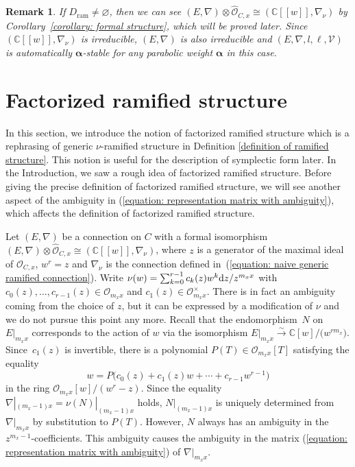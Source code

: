 \documentclass[pdftex]{sigma}
\numberwithin{equation}{section}
\newtheorem{Remark}[Theorem]{Remark}
\newcommand{\balpha}{\boldsymbol \alpha}
\begin{document}
\begin{Remark}If $D_{\mathrm{ram}}\neq\varnothing$,
then we can see
$(E,\nabla)\otimes\widehat{\mathcal O}_{C,x}\cong(\mathbb{C}[[w]],\nabla_{\nu})$
by Corollary~\ref{corollary: formal structure},
which will be proved later.
Since $(\mathbb{C}[[w]],\nabla_{\nu})$ is irreducible,
$(E,\nabla)$ is also irreducible and
$(E,\nabla,l,\ell,{\mathcal V})$ is automatically $\balpha$-stable for
any parabolic weight $\balpha$ in this case.
\end{Remark}



\section {Factorized ramified structure}
\label{section: factorized ramified structure}


In this section, we introduce the notion of factorized ramified structure
which is a rephrasing of generic $\nu$-ramified structure
in Definition \ref{definition of ramified structure}.
This notion is useful for the description of symplectic form later.
In the Introduction, we saw a rough idea of factorized ramified structure.
Before giving the precise definition of factorized ramified structure,
we will see another aspect of the ambiguity
in (\ref{equation: representation matrix with ambiguity}),
which affects the definition of factorized ramified structure.

Let $(E,\nabla)$ be a connection on $C$ with a formal isomorphism
$(E,\nabla)\otimes\widehat{\mathcal O}_{C,x}
\cong (\mathbb{C}[[w]], \nabla_{\nu})$,
where $z$ is a generator of the maximal ideal of ${\mathcal O}_{C,x}$, $w^r=z$
and $\nabla_{\nu}$ is the connection defined in~(\ref{equation: naive generic ramified connection}).
Write
$\nu(w)=\sum_{k=0}^{r-1} c_k(z) w^k {\rm d}z/z^{m_xx}$
with $c_0(z),\dots,c_{r-1}(z)\in
{\mathcal O}_{m_xx}$
and ${c_1(z)\in{\mathcal O}_{m_xx}^{\times}}$.
There is in fact an ambiguity coming from the choice of $z$,
but it can be expressed by a modification of $\nu$ and
we do not pursue this point any more.
Recall that the endomorphism~$N$ on~$E|_{m_xx}$ corresponds to
the action of $w$ via the isomorphism
$E|_{m_xx}\xrightarrow{\sim} \mathbb{C}[w]/\big(w^{rm_x}\big)$.
Since~$c_1(z)$ is invertible,
there is a polynomial
$P(T)\in {\mathcal O}_{m_xx}[T]$ satisfying
the equality
\[
 w=P\big(c_0(z)+c_1(z)w+\cdots+c_{r-1}w^{r-1}\big)
\]
in the ring ${\mathcal O}_{m_xx}[w]/(w^r-z)$.
Since the equality $\nabla|_{(m_x-1)x}=\nu(N)|_{(m_x-1)x}$ holds,
$N|_{(m_x-1)x}$ is uniquely determined from $\nabla|_{m_xx}$ by substitution to $P(T)$.
However, $N$ always has an ambiguity in the $z^{m_x-1}$-coefficients.
This ambiguity causes the ambiguity in the matrix
(\ref{equation: representation matrix with ambiguity}) of $\nabla|_{m_xx}$.
\end{document}
